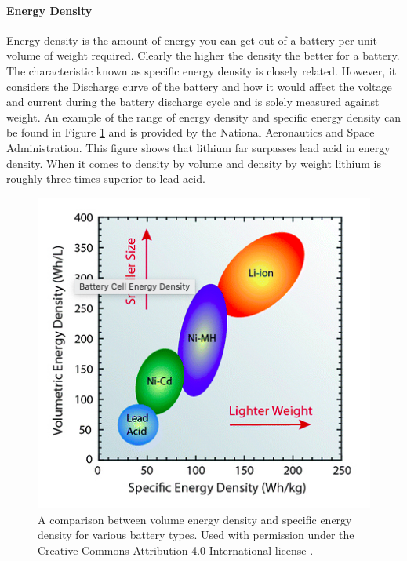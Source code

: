 \paragraph{Energy Density}
Energy density is the amount of energy you can get out of a battery per unit volume of weight required. Clearly the higher the density the better for a battery. The characteristic known as specific energy density is closely related. However, it considers the Discharge curve of the battery and how it would affect the voltage and current during the battery discharge cycle and is solely measured against weight. An example of the range of energy density and specific energy density can be found in Figure \ref{fig:energy-density} and is provided by the National Aeronautics and Space Administration. This figure shows that lithium far surpasses lead acid in energy density. When it comes to density by volume and density by weight lithium is roughly three times superior to lead acid.
\cite{Differences-between-Lithium-Ion-and-Lead-acid-batteries}
\begin{figure}
    \centering
    \includegraphics[scale=0.4]{figures/energy density.png}
    \caption{A comparison between volume energy density and specific energy density for various battery types. Used with permission under the Creative Commons Attribution 4.0 International license \cite{Energy-den-ref}.}
    \label{fig:energy-density} 
\end{figure}

